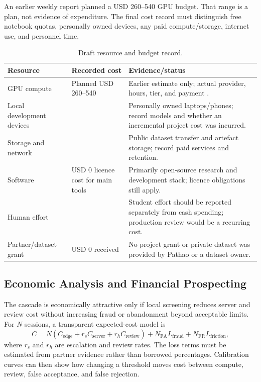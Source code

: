 An earlier weekly report planned a USD 260--540 GPU budget. That range is a plan,
not evidence of expenditure. The final cost record must distinguish free notebook
quotas, personally owned devices, any paid compute/storage, internet use, and
personnel time.

\begin{table}[H]
\centering
\caption{Draft resource and budget record.}
\label{tab:budget}
\begin{tabularx}{\textwidth}{@{}p{39mm}p{33mm}Y@{}}
\toprule
Resource & Recorded cost & Evidence/status \\
\midrule
GPU compute & Planned USD 260--540 & Earlier estimate only; actual provider,
hours, tier, and payment . \\
Local development devices &  & Personally owned laptops/phones;
record models and whether an incremental project cost was incurred. \\
Storage and network &  & Public dataset transfer and artefact
storage; record paid services and retention. \\
Software & USD 0 licence cost for main tools & Primarily open-source research and
development stack; licence obligations still apply. \\
Human effort &  & Student effort should be reported separately
from cash spending; production review would be a recurring cost. \\
Partner/dataset grant & USD 0 received & No project grant or private dataset was
provided by Pathao or a dataset owner. \\
\bottomrule
\end{tabularx}
\end{table}

\subsection{Economic Analysis and Financial Prospecting}

The cascade is economically attractive only if local screening reduces server
and review cost without increasing fraud or abandonment beyond acceptable limits.
For $N$ sessions, a transparent expected-cost model is
\begin{equation}
C=N(C_{\mathrm{edge}}+r_sC_{\mathrm{server}}+r_hC_{\mathrm{review}})
 + N_{\mathrm{FA}}L_{\mathrm{fraud}}
 + N_{\mathrm{FR}}L_{\mathrm{friction}},
\end{equation}
where $r_s$ and $r_h$ are escalation and review rates. The loss terms must be
estimated from partner evidence rather than borrowed percentages. Calibration
curves can then show how changing a threshold moves cost between compute, review,
false acceptance, and false rejection.

